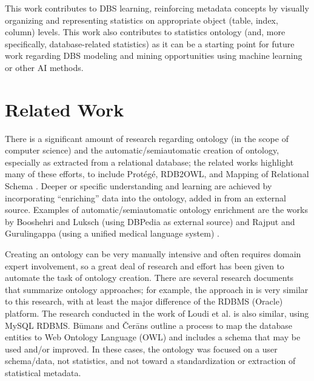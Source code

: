 \documentclass[sigconf]{acmart}
\begin{document}
This work contributes to DBS learning, reinforcing metadata concepts by visually organizing and representing statistics on appropriate object (table, index, column) levels. This work also contributes to statistics ontology (and, more specifically, database-related statistics) as it can be a starting point for future work regarding DBS modeling and mining opportunities using machine learning or other AI methods.

\section{Related Work}
There is a significant amount of research regarding ontology (in the scope of computer science) and the automatic/semiautomatic creation of ontology, especially as extracted from a relational database; the related works highlight many of these efforts, to include Protégé, RDB2OWL, and Mapping of Relational Schema \cite{christian2017mapping}. Deeper or specific understanding and learning are achieved by incorporating “enriching” data into the ontology, added in from an external source. Examples of automatic/semiautomatic ontology enrichment are the works by Booshehri and Luksch (using DBPedia as external source) \cite{booshehri2015ontology} and Rajput and Gurulingappa (using a unified medical language system) \cite{rajput2013semi}.

Creating an ontology can be very manually intensive and often requires domain expert involvement, so a great deal of research and effort has been given to automate the task of ontology creation. There are several research documents that summarize ontology approaches; for example, the approach in \cite{christian2017mapping} is very similar to this research, with at least the major difference of the RDBMS (Oracle) platform. The research conducted in the work of Loudi et al. \cite{louhdi2013hybrid} is also similar, using MySQL RDBMS. Būmans and Čerāns \cite{bumans2018rdb2owl} outline a process to map the database entities to Web Ontology Language (OWL) and includes a schema that may be used and/or improved. In these cases, the ontology was focused on a user schema/data, not statistics, and not toward a standardization or extraction of statistical metadata. 

\end{document}
